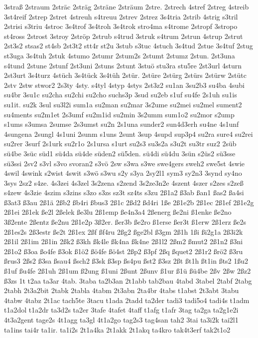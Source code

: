 {3straß
2straum
2sträc
2sträg
2sträne
2sträum
2stre.
2strech
4stref
2streg
4streib
3st4reif
2strep
2stret
4streuh
s4treuu
2strev
2strez
3s4tria
2strib
4strig
s3tril
2strisi
s3triu
4stroc
3s4trof
3s4troh
3s4trok
stro4ma
s4trome
2stropf
3stropo
st4ross
2strost
3stroy
2ströp
2strub
s4trud
3struk
s4trum
2strun
4strup
2strut
2st3s2
stsas2
st4sb
2st3t2
stt4r
st2u
3stub
s3tuc
4stuch
3s4tud
2stue
3s4tuf
2stug
st3uga
3s4tuh
2stuk
4stumo
2stumr
2stum2s
2stumt
2stumz
2stun.
2st3una
s4tund
2stune
2stunf
2st3uni
2stuns
2stunt
3stuö
stu3ra
stu5re
2st3url
4sturn
2st3urt
3s4turz
4stüch
3s4tück
3s4tüh
2stür.
2stüre
2stürg
2stürs
2stürw
2stütc
2stv
2stw
stwor2
2s3ty
4sty.
s4tyl
4styp
4stys
2st3z2
su1an
3su2b3
su4ba
4subi
su4br
3su1c
su2cha
su2chi
su2cho
suchs3p
3sud
su2eb
s1uf
su4fe
2s1uh
su1is
su1it.
su2k
3sul
su3l2i
sum1a
su2man
su2mar
3s2ume
su2mei
su2mel
sument2
su4ments
su2m1et
2s3umf
su2m1id
su2min
3s2umm
sum1o2
su2mor
s2ump
s1ums
s3umsa
2sumse
2s3umst
su2n
2s1una
sunder2
sun4d3erh
su4ne
4s1unf
4sungena
2sungl
4s1uni
2sunm
s1uns
2sunt
3sup
4supd
sup3p4
su2ra
sure4
su2rei
su2rer
3surf
2s1urk
su2r1o
2s1ursa
s1urt
su2s3
su3s2a
s3u2t
su3tr
suz2
2süb
sü4be
3süc
süd1
sü4da
sü4de
süden2
sü5den.
sü4di
sü4du
3sün
s2üs2
sü3sse
sü3ssi
2sv2
s3vl
s3vo
svoran2
s3vö
2sw
s3wa
s3we
swe4gers
sweh2
swe5st
4swie
4swil
4swink
s2wist
4swit
s3wö
s3wu
s2y
s3ya
2sy2l1
sym3
sy2n3
3synd
sy4no
3sys
2sz2
s4ze.
4s3zei
4s3zel
3s2zena
s2zend
3s2ze3n2e
4szent
4szer
s2zes
s2zeß
s4zew
4s3zie
4szim
s3zins
s3zo
s3zs
sz3t
sz4ts
s3zu
2ß1a2
ß3ab
ßan1
ßas2
ßa4si
ß3at3
ß3au
2ß1ä
2ßb2
ßb4ri
ßbus3
2ß1c
2ßd2
ßd4ri
1ße
2ß1e2b
2ß1ec
2ß1ef
2ß1e2g
2ß1ei
2ß1ek
ße2l
2ßelek
ße3lu
2ß1emp
ße4n3a4
2ßenerg
ße2ni
ß1enke
ße2no
3ß2ente
2ßentz
ße2nu
2ß1e2p
3ß2er.
ßer3b
ße2ro
ß1erse
ßer3t
ß1erw
2ß1erz
ße2s
2ß1es2s
2ß3estr
ße2t
2ß1ex
2ßf
ßf4ru
2ßg2
ßge2bl
ß3gm
2ß1h
1ßi
ßi2g1a
2ß3i2k
2ß1il
2ß1im
2ß1in
2ßk2
ß3kh
ßk4le
ßk4na
ßk4ne
2ß1l2
2ßm2
ßmut2
2ß1n2
ß3ni
2ß1o2
ß3oa
ßo4fe
ß3ok
ß1ö2
ßö4fe
ßö4st
2ßp2
ß3pf
2ßq
ßquet2
2ß1r2
ßrö2
ß3ru
ßrus3
2ßs2
ß3sa
ßsau4
ßsch2
ß3sk
ß3sp
ßs4pu
ßst2
ß3sz
2ßt
ßt1h
ßt1in
ßts2
1ßu2
ß1uf
ßu4fe
2ß1uh
2ß1um
ß2ung
ß1uni
2ßunt
2ßunv
ß1ur
ß1ü
ßü4be
2ßv
2ßw
2ßz2
ß3zs
1t
t2aa
ta3ar
4tab.
3taba
ta2b3an
2t1abb
tab2bau
4tabd
3tabel
2tabf
2tabg
2tabh
2t3a2bit
2tabk
2tabla
4tabm
2t3abn
2ta4br
4tabs
t1abst
2t3abt
3tabu
4tabw
4tabz
2t1ac
tach5te
3tacu
t1ada
2tadd
ta2der
tadi3
tadi5o4
tadi4s
t1adm
t1a2dol
t1a2dr
ta3d2s
ta2er
3tafe
4tafet
4taff
t1afg
t1afr
3tag
ta2ga
ta2g1e2i
4t3a2gent
tage2s
4t1agg
ta3gl
4t1a2go
tag2s3
tag4san
tah2
3tai
ta3i2k
tai2l1
ta1ins
tai4r
ta1ir.
ta1i2s
2t1a4ka
2t1akk
2t1akq
ta4kro
tak4t3erf
tak2t1o2
}
